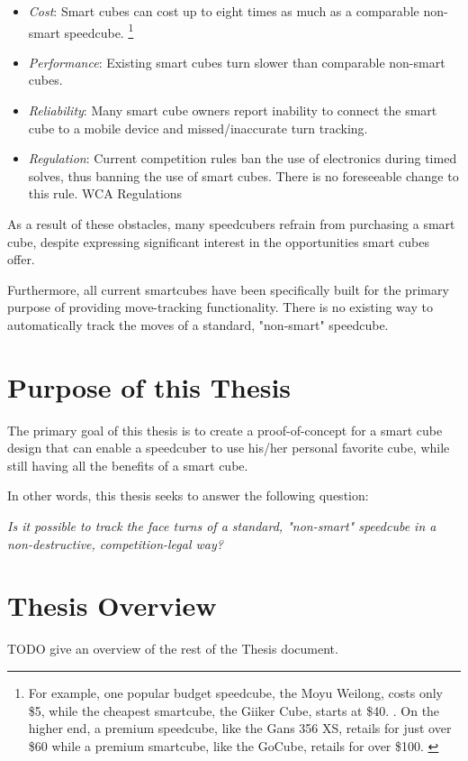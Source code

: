 \begin{itemize}

    \item \emph{Cost}: Smart cubes can cost up to eight times as much
    as a comparable non-smart speedcube. \footnote{For example, one
    popular budget speedcube, the Moyu Weilong, costs only \$5, while
    the cheapest smartcube, the Giiker Cube, starts at \$40.
    \cite{TODO}. On the higher end, a premium speedcube, like the Gans
    356 XS, retails for just over \$60 while a premium smartcube, like
    the GoCube, retails for over \$100. \cite{TODO}}
    
    \item \emph{Performance}: Existing smart cubes turn slower than
    comparable non-smart cubes. \cite{TODO}
    
    \item \emph{Reliability}: Many smart cube owners report inability
    to connect the smart cube to a mobile device and missed/inaccurate
    turn tracking. \cite{TODO}
    
    \item \emph{Regulation}: Current competition rules ban the use of
    electronics during timed solves, thus banning the use of smart
    cubes. There is no foreseeable change to this rule. \cite{TODO} %
    WCA Regulations
    
\end{itemize}

As a result of these obstacles, many speedcubers refrain from
purchasing a smart cube, despite expressing significant interest in the
opportunities smart cubes offer.

Furthermore, all current smartcubes have been specifically built for
the primary purpose of providing move-tracking functionality. There is
no existing way to automatically track the moves of a standard,
"non-smart" speedcube.


\section{Purpose of this Thesis}
\label{sec:thesis-purpose}

The primary goal of this thesis is to create a proof-of-concept for a
smart cube design that can enable a speedcuber to use his/her personal
favorite cube, while still having all the benefits of a smart cube.

In other words, this thesis seeks to answer the following question:

\emph{Is it possible to track the face turns of a standard, "non-smart"
speedcube in a non-destructive, competition-legal way?}


\section{Thesis Overview}
\label{sec:thesis-overview}

TODO give an overview of the rest of the Thesis document.